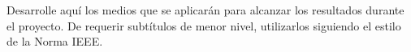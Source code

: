 Desarrolle aquí los medios que se aplicarán para alcanzar los resultados durante el proyecto. De requerir subtítulos de menor nivel, utilizarlos siguiendo el estilo de la Norma IEEE.